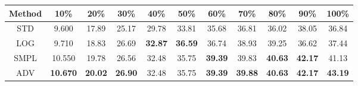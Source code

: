 \documentclass{standalone}
\begin{document}
\begin{tabular}{c|cccccccccc}
      \toprule
      Method & 10\% & 20\% & 30\% & 40\% & 50\% & 60\% & 70\% & 80\% & 90\% & 100\% \\
      \midrule
STD & 9.600 & 17.89 & 25.17 & 29.78 & 33.81 & 35.68 & 36.81 & 36.02 & 38.05 & 36.84\\
LOG & 9.710 & 18.83 & 26.69 & \textbf{32.87} & \textbf{36.59} & 36.74 & 38.93 & 39.25 & 36.62 & 37.44\\
SMPL & 10.550 & 19.78 & 26.56 & 32.48 & 35.75 & \textbf{39.39} & 39.83 & \textbf{40.63} & \textbf{42.17} & 41.13\\
ADV & \textbf{10.670} & \textbf{20.02} & \textbf{26.90} & 32.48 & 35.75 & \textbf{39.39} & \textbf{39.88} & \textbf{40.63} & \textbf{42.17} & \textbf{43.19}\\
  \bottomrule
\end{tabular}
\end{document}
